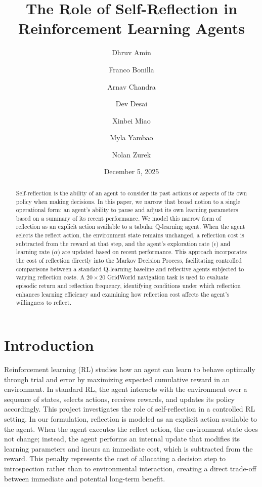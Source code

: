 \documentclass[11pt]{article}
\title{The Role of Self-Reflection in Reinforcement Learning Agents}
\author[1]{Dhruv Amin}
\author[1]{Franco Bonilla}
\author[1]{Arnav Chandra}
\author[1]{Dev Desai}
\author[1]{Xinbei Miao}
\author[1]{Myla Yambao}
\author[1]{Nolan Zurek}
\affil[1]{Department of Computing Science, University of Alberta, Edmonton, Alberta, T6G 2E8, Canada}
\date{December 5, 2025}
\begin{document}
\maketitle

\begin{abstract}
Self-reflection is the ability of an agent to consider its past actions or aspects of its own policy when making decisions. In this paper, we narrow that broad notion to a single operational form: an agent's ability to pause and adjust its own learning parameters based on a summary of its recent performance. We model this narrow form of reflection as an explicit action available to a tabular Q-learning agent. When the agent selects the reflect action, the environment state remains unchanged, a reflection cost is subtracted from the reward at that step, and the agent's exploration rate ($\epsilon$) and learning rate ($\alpha$) are updated based on recent performance. This approach incorporates the cost of reflection directly into the Markov Decision Process, facilitating controlled comparisons between a standard Q-learning baseline and reflective agents subjected to varying reflection costs. A $20\times20$ GridWorld navigation task is used to evaluate episodic return and reflection frequency, identifying conditions under which reflection enhances learning efficiency and examining how reflection cost affects the agent's willingness to reflect.
\end{abstract}

\section{Introduction}

Reinforcement learning (RL) studies how an agent can learn to behave optimally through trial and error by maximizing expected cumulative reward in an environment. In standard RL, the agent interacts with the environment over a sequence of states, selects actions, receives rewards, and updates its policy accordingly. This project investigates the role of self-reflection in a controlled RL setting. In our formulation, reflection is modeled as an explicit action available to the agent. When the agent executes the reflect action, the environment state does not change; instead, the agent performs an internal update that modifies its learning parameters and incurs an immediate cost, which is subtracted from the reward. This penalty represents the cost of allocating a decision step to introspection rather than to environmental interaction, creating a direct trade-off between immediate and potential long-term benefit.
\end{document}
